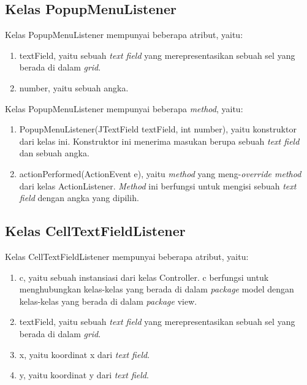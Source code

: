 \subsection{Kelas PopupMenuListener}
\label{sec:kelaspopupmenulistener}

Kelas PopupMenuListener mempunyai beberapa atribut, yaitu:

\begin{enumerate}
\item textField, yaitu sebuah \textit{text field} yang merepresentasikan sebuah sel yang berada di dalam \textit{grid}.
\item number, yaitu sebuah angka.
\end{enumerate}

Kelas PopupMenuListener mempunyai beberapa \textit{method}, yaitu:

\begin{enumerate}
\item PopupMenuListener(JTextField textField, int number), yaitu konstruktor dari kelas ini. Konstruktor ini menerima masukan berupa sebuah \textit{text field} dan sebuah angka.
\item actionPerformed(ActionEvent e), yaitu \textit{method} yang meng-\textit{override method} dari kelas ActionListener. \textit{Method} ini berfungsi untuk mengisi sebuah \textit{text field} dengan angka yang dipilih.
\end{enumerate}

\subsection{Kelas CellTextFieldListener}
\label{sec:kelascelltextfieldlistener}

Kelas CellTextFieldListener mempunyai beberapa atribut, yaitu:

\begin{enumerate}
\item c, yaitu sebuah instansiasi dari kelas Controller. c berfungsi untuk menghubungkan kelas-kelas yang berada di dalam \textit{package} model dengan kelas-kelas yang berada di dalam \textit{package} view.
\item textField, yaitu sebuah \textit{text field} yang merepresentasikan sebuah sel yang berada di dalam \textit{grid}.
\item x, yaitu koordinat x dari \textit{text field}.
\item y, yaitu koordinat y dari \textit{text field}.
\end{enumerate}

